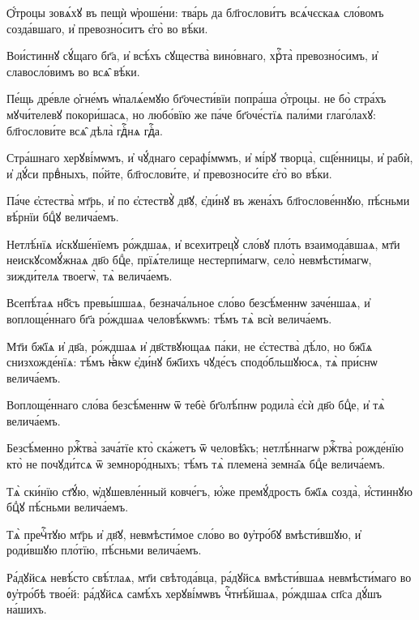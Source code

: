 \hKv Ѻ҆́троцы зовѧ́хꙋ въ пещѝ ѡ҆роше́ни: тва́рь да  бл҃гослови́тъ всѧ́чєскаѧ сло́вомъ созда́вшаго, и҆  превозно́ситъ є҆го̀ во вѣ́ки. 

\hKv Вои́стиннꙋ сꙋ́щаго бг҃а, и҆ всѣ́хъ сꙋщества̀ вино́внаго,  хрⷭ҇та̀ превозно́симъ, и҆ славосло́вимъ во всѧ̑ вѣ́ки. 

\hKv Пе́щь дре́вле ѻ҆гне́мъ ѡ҆палѧ́емꙋю бг҃очести́вїи попра́ша  ѻ҆́троцы. не бо̀ стра́хъ мꙋчи́телевꙋ покори́шасѧ, но  любо́вїю же па́че бг҃оче́стїѧ пали́ми глаго́лахꙋ:  бл҃гослови́те всѧ̑ дѣла̀ гдⷭ҇нѧ гдⷭ҇а. 

\hKv Стра́шнаго херꙋві́мѡмъ, и҆ чꙋ́днаго серафі́мѡмъ, и҆ мі́рꙋ  творца̀, сщ҃е́нницы, и҆ рабѝ, и҆ дꙋ́си првⷣныхъ, по́йте,  бл҃гослови́те, и҆ превозноси́те є҆го̀ во вѣ́ки.  
%

\hKv Па́че є҆стества̀ мт҃рь, и҆ по є҆стествꙋ̀ дв҃ꙋ, є҆ди́нꙋ въ  жена́хъ бл҃гослове́ннꙋю, пѣ́сньми вѣ́рнїи бцⷣꙋ  велича́емъ. 
%

\hKv Нетлѣ́нїѧ и҆скꙋше́нїемъ ро́ждшаѧ, и҆  всехитрецꙋ̀ сло́вꙋ пло́ть взаимода́вшаѧ, мт҃и  неискꙋсомꙋ́жнаѧ дв҃о бцⷣе, прїѧ́телище нестерпи́магѡ, село̀  невмѣсти́магѡ, зижди́телѧ твоегѡ̀, тѧ̀ велича́емъ. 
%

\hKv Всепѣ́таѧ нб҃съ превы́шшаѧ, безнача́льное сло́во  безсѣ́меннѡ заче́ншаѧ, и҆ воплоще́ннаго бг҃а ро́ждшаѧ  человѣ́кѡмъ: тѣ́мъ тѧ̀ всѝ велича́емъ. 

\hKv Мт҃и бж҃їѧ и҆ дв҃а, ро́ждшаѧ и҆ дв҃ствꙋющаѧ па́ки, не  є҆стества̀ дѣ́ло, но бж҃їѧ снизхожде́нїѧ: тѣ́мъ ꙗ҆́кѡ  є҆ди́нꙋ бж҃їихъ чꙋде́съ сподо́бльшꙋюсѧ, тѧ̀ при́снѡ  велича́емъ. 

\hKv Воплоще́ннаго сло́ва безсѣ́меннѡ ѿ тебѐ бг҃олѣ́пнѡ  родила̀ є҆сѝ дв҃о бцⷣе, и҆ тѧ̀ велича́емъ.  

\hKv Безсѣ́менно ржⷭ҇тва̀ зача́тїе кто̀ ска́жетъ ѿ человѣ̑къ;  нетлѣ́ннагѡ ржⷭ҇тва̀ рожде́нїю кто̀ не почꙋди́тсѧ ѿ  земноро́дныхъ; тѣ́мъ тѧ̀ племена̀ земна̑ѧ бцⷣе велича́емъ. 

\hKv Тѧ̀ ски́нїю ст҃ꙋ́ю, ѡ҆дꙋшевле́нный ковче́гъ, ю҆́же  премꙋ́дрость бж҃їѧ созда̀, и҆́стиннꙋю бцⷣꙋ пѣ́сньми  велича́емъ. 

\hKv Тѧ̀ пречⷭ҇тꙋю мт҃рь и҆ дв҃ꙋ, невмѣсти́мое сло́во во  ᲂу҆тро́бꙋ вмѣсти́вшꙋю, и҆ роди́вшꙋю пло́тїю, пѣ́сньми  велича́емъ. 

\hKv Ра́дꙋйсѧ невѣ́сто свѣ́тлаѧ, мт҃и свѣтода́вца, ра́дꙋйсѧ  вмѣсти́вшаѧ невмѣсти́маго во ᲂу҆тро́бѣ твое́й: ра́дꙋйсѧ  самѣ́хъ херꙋві́мѡвъ чⷭ҇тнѣ́йшаѧ, ро́ждшаѧ сп҃са дꙋ́шъ  на́шихъ.  

